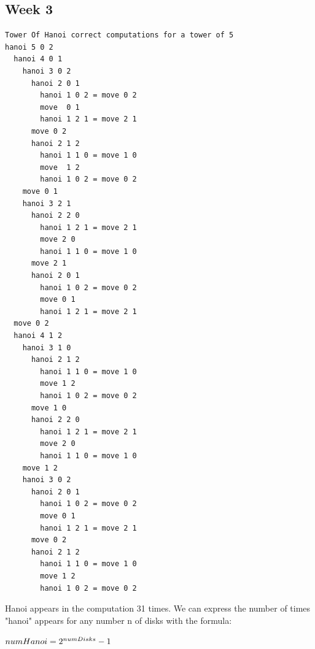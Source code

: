 \documentclass{article}
\theoremstyle{theorem}
\theoremstyle{definition}
\theoremstyle{remark}
\begin{document}
\subsection{Week 3}

\begin{verbatim}
Tower Of Hanoi correct computations for a tower of 5
hanoi 5 0 2
  hanoi 4 0 1 
    hanoi 3 0 2
      hanoi 2 0 1 
        hanoi 1 0 2 = move 0 2 
        move  0 1
        hanoi 1 2 1 = move 2 1 
      move 0 2  
      hanoi 2 1 2  
        hanoi 1 1 0 = move 1 0  
        move  1 2  
        hanoi 1 0 2 = move 0 2 
    move 0 1
    hanoi 3 2 1
      hanoi 2 2 0
        hanoi 1 2 1 = move 2 1
        move 2 0
        hanoi 1 1 0 = move 1 0
      move 2 1
      hanoi 2 0 1
        hanoi 1 0 2 = move 0 2
        move 0 1
        hanoi 1 2 1 = move 2 1
  move 0 2
  hanoi 4 1 2
    hanoi 3 1 0
      hanoi 2 1 2
        hanoi 1 1 0 = move 1 0
        move 1 2
        hanoi 1 0 2 = move 0 2
      move 1 0
      hanoi 2 2 0
        hanoi 1 2 1 = move 2 1
        move 2 0
        hanoi 1 1 0 = move 1 0
    move 1 2
    hanoi 3 0 2
      hanoi 2 0 1
        hanoi 1 0 2 = move 0 2
        move 0 1
        hanoi 1 2 1 = move 2 1
      move 0 2
      hanoi 2 1 2
        hanoi 1 1 0 = move 1 0
        move 1 2
        hanoi 1 0 2 = move 0 2

\end{verbatim}

Hanoi appears in the computation 31 times.
We can express the number of times "hanoi" appears for any number n of disks with the formula: 

\begin{math}
$$numHanoi =2^{numDisks}-1$$
\end{math}
\end{document}
